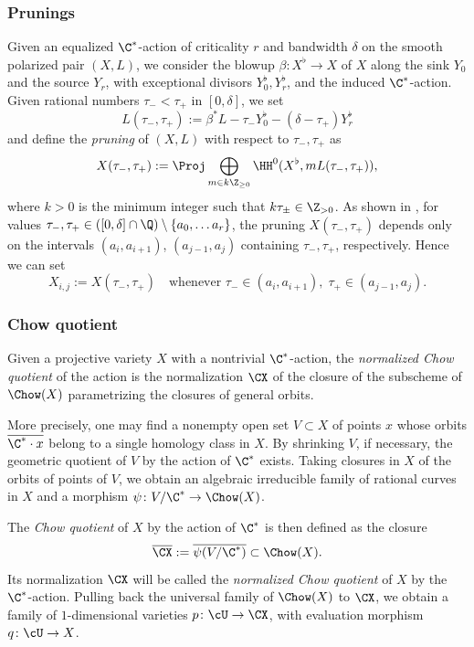 \documentclass[11pt]{amsart}
\numberwithin{equation}{section}
\theoremstyle{definition}
\theoremstyle{remark}
\begin{document}
\subsubsection{Prunings} \label{ssec:prun}

Given an equalized $\C^*$-action of criticality $r$ and bandwidth $\delta$ on the smooth polarized pair $(X,L)$,  we consider the blowup $\beta\colon X^\flat\to X$ of $X$ along the sink $Y_0$  and the source $Y_r$, with exceptional divisors $Y^\flat_0,Y^\flat_r$, and the induced $\C^*$-action.
Given rational numbers $\tau_-<\tau_+$ in $[0,\delta]$, we set
\[
L(\tau_-,\tau_+):=\beta^*L-\tau_-Y^\flat_0-(\delta-\tau_+)Y^\flat_r 
\]
and define the {\em pruning} of $(X,L)$ with respect to $\tau_-,\tau_+$ as
\[X(\tau_-,\tau_+):=\Proj \bigoplus_{m\in k\Z_{\geq 0}}\HH^0(X^\flat,mL(\tau_-,\tau_+)),\]
where $k>0$ is the minimum integer such that $k\tau_\pm\in \Z_{> 0}$.
As shown in \cite[Lemma 3.5]{WORS6}, for values $\tau_-,\tau_+\in([0,\delta]\cap\Q)\setminus\{a_0,\dots a_r\}$, the pruning $X(\tau_-,\tau_+)$ depends only on the intervals $(a_i,a_{i+1})$, $ (a_{j-1},a_j)$ containing $\tau_-,\tau_+$, respectively. Hence we can set
$$X_{i,j}:=X(\tau_-,\tau_+)\quad\mbox{whenever } \tau_-\in(a_i,a_{i+1}), \;\tau_+\in (a_{j-1},a_j).$$ 

\subsubsection{Chow quotient}

Given a projective variety $X$ with a nontrivial $\C^*$-action, the {\em normalized Chow quotient} of the action is the normalization $\CX$ of the closure of the subscheme of $\Chow(X)$ parametrizing the closures of general orbits.

More precisely, one may find a nonempty open set $V\subset X$ of points $x$ whose orbits $\overline{\C^*\cdot x}$ belong to a single homology class in $X$. By shrinking $V$, if necessary, the geometric quotient of $V$ by the action of $\C^*$ exists. Taking closures in $X$ of the orbits of points of $V$, we obtain an algebraic irreducible family of rational curves in $X$ and a morphism $\psi\colon V/\C^*\to \Chow(X)$.

The {\em Chow quotient} of $X$ by the action of $\C^*$ is then defined as the closure 
$$
\overline{\CX}:=\overline{\psi(V/\C^*)}\subset \Chow(X).
$$
Its normalization $\CX$ will be called the {\em normalized Chow quotient} of $X$ by the $\C^*$-action.  Pulling back the universal family of $\Chow(X)$ to $\CX$, we obtain a family of $1$-dimensional varieties $p\colon\cU\to \CX$, with evaluation morphism $q\colon\cU\to X$.
\end{document}
